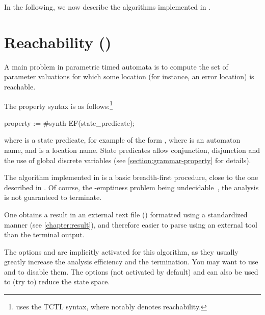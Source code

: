 In the following, we now describe the algorithms implemented in \imitator{}.

\section{Reachability ()}\label{section:algorithm:EFsynth}

A main problem in parametric timed automata is to compute the set of parameter valuations for which some location (for instance, an error location) is reachable.

The property syntax is as follows:\footnote{%
	\imitator{} uses the TCTL syntax, where  notably denotes reachability.
}

\begin{IMITATORproperty}
property := #synth EF(state_predicate);
\end{IMITATORproperty}


\noindent{}where  is a state predicate, for example of the form , where  is an automaton name, and  is a location name.
State predicates allow conjunction, disjunction and the use of global discrete variables (see \cref{section:grammar-property} for details).



The algorithm \EFsynth{} implemented in \imitator{} is a basic breadth-first procedure, close to the one described in \cite{JLR15}.
Of course, the -emptiness problem being undecidable~\cite{AHV93}, the analysis is not guaranteed to terminate.

One obtains a result in an external text file () formatted using a standardized manner (see \cref{chapter:result}), and therefore easier to parse using an external tool than the terminal output.

The options  \cite{AFS13atva} and  are implicitly activated for this algorithm, as they usually greatly increase the analysis efficiency and the termination.
You may want to use  and  to disable them.
The options  (not activated by default) and  can also be used to (try to) reduce the state space.

